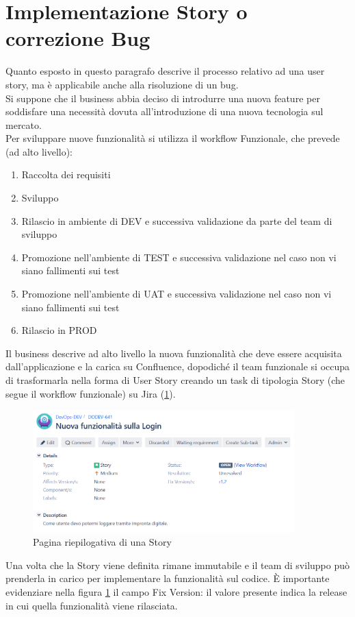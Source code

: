 \documentclass[a4paper, 12pt]{report}
\numberwithin{equation}{section}
\begin{document}
\section{Implementazione Story o correzione Bug}
Quanto esposto in questo paragrafo descrive il processo relativo ad una user story, ma è applicabile anche alla risoluzione di un bug.\\
Si suppone che il business abbia deciso di introdurre una nuova feature per soddisfare una necessità dovuta all’introduzione di una nuova tecnologia sul mercato.\\
Per sviluppare nuove funzionalità si utilizza il workflow Funzionale, che prevede (ad alto livello):
\begin{enumerate}
    \item Raccolta dei requisiti
    \item Sviluppo
    \item Rilascio in ambiente di DEV e successiva validazione da parte del team di sviluppo
    \item Promozione nell’ambiente di TEST e successiva validazione nel caso non vi siano fallimenti sui test
    \item Promozione nell’ambiente di UAT e successiva validazione nel caso non vi siano fallimenti sui test
    \item Rilascio in PROD
\end{enumerate}
Il business descrive ad alto livello la nuova funzionalità che deve essere acquisita dall’applicazione e la carica su Confluence, dopodiché il team funzionale si occupa di trasformarla nella forma di User Story creando un task di tipologia Story (che segue il workflow funzionale) su Jira (\ref{fig:jira-story}).
\begin{figure}
    \centering
    \includegraphics[width=0.9\textwidth]{imgs/story.png}
    \caption{Pagina riepilogativa di una Story}
    \label{fig:jira-story}
\end{figure}
Una volta che la Story viene definita rimane immutabile e il team di sviluppo può prenderla in carico per implementare la funzionalità sul codice. È importante evidenziare nella figura \ref{fig:jira-story} il campo Fix Version: il valore presente indica la release in cui quella funzionalità viene rilasciata.\\
\end{document}
